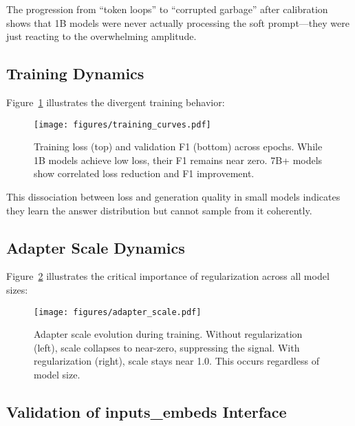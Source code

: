 \documentclass{article}
\begin{document}
The progression from ``token loops'' to ``corrupted garbage'' after calibration shows that 1B models were never actually processing the soft prompt—they were just reacting to the overwhelming amplitude.

\subsection{Training Dynamics}

Figure~\ref{fig:training_curves} illustrates the divergent training behavior:

\begin{figure}[h]
\vskip 0.2in
\begin{center}
\centerline{\texttt{[image: figures/training\_curves.pdf]}}
\caption{Training loss (top) and validation F1 (bottom) across epochs. While 1B models achieve low loss, their F1 remains near zero. 7B+ models show correlated loss reduction and F1 improvement.}
\label{fig:training_curves}
\end{center}
\vskip -0.2in
\end{figure}

This dissociation between loss and generation quality in small models indicates they learn the answer distribution but cannot sample from it coherently.

\subsection{Adapter Scale Dynamics}

Figure~\ref{fig:scale} illustrates the critical importance of regularization across all model sizes:

\begin{figure}[h]
\vskip 0.2in
\begin{center}
\centerline{\texttt{[image: figures/adapter\_scale.pdf]}}
\caption{Adapter scale evolution during training. Without regularization (left), scale collapses to near-zero, suppressing the signal. With regularization (right), scale stays near 1.0. This occurs regardless of model size.}
\label{fig:scale}
\end{center}
\vskip -0.2in
\end{figure}

\subsection{Validation of inputs\_embeds Interface}
\end{document}
